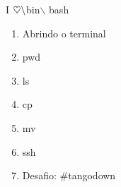 \begin{center}
	{\huge I $\heartsuit\space  \backslash$bin$\backslash$ bash}
\end{center}

\begin{enumerate}
	\item Abrindo o terminal
	\item pwd
	\item ls
	\item cp
	\item mv
	\item ssh
	\item Desafio: \#tangodown
\end{enumerate}

\vfill\null
\columnbreak
